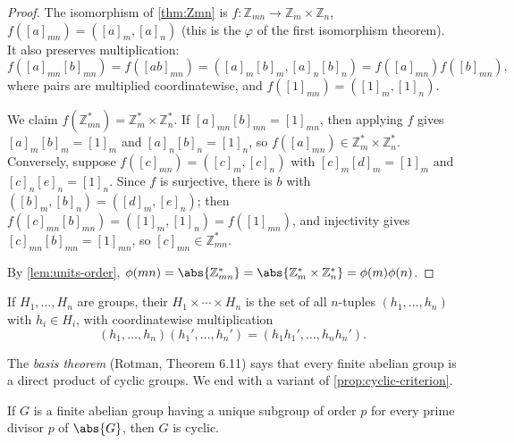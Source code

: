 \begin{proof}
	The isomorphism of \autoref{thm:Zmn} is
	\(f\colon \mathbb Z_{mn} \to \mathbb Z_m \times \mathbb Z_n\),
	\(f([a]_{mn}) = ([a]_m, [a]_n)\) (this is the \(\varphi\) of the first isomorphism
	theorem). It also preserves multiplication:
	\[
		f([a]_{mn}[b]_{mn}) = f([ab]_{mn}) = ([a]_m[b]_m, [a]_n[b]_n) = f([a]_{mn})f([b]_{mn}),
	\]
	where pairs are multiplied coordinatewise, and \(f([1]_{mn}) = ([1]_m, [1]_n)\).

	We claim \(f(\mathbb Z_{mn}^*) = \mathbb Z_m^* \times \mathbb Z_n^*\). If
	\([a]_{mn}[b]_{mn} = [1]_{mn}\), then applying \(f\) gives \([a]_m[b]_m = [1]_m\) and
	\([a]_n[b]_n = [1]_n\), so \(f([a]_{mn}) \in \mathbb Z_m^* \times \mathbb Z_n^*\).
	Conversely, suppose \(f([c]_{mn}) = ([c]_m, [c]_n)\) with \([c]_m[d]_m = [1]_m\) and
	\([c]_n[e]_n = [1]_n\). Since \(f\) is surjective, there is \(b\) with
	\(([b]_m, [b]_n) = ([d]_m, [e]_n)\); then
	\(f([c]_{mn}[b]_{mn}) = ([1]_m, [1]_n) = f([1]_{mn})\), and injectivity gives
	\([c]_{mn}[b]_{mn} = [1]_{mn}\), so \([c]_{mn} \in \mathbb Z_{mn}^*\).

	By \autoref{lem:units-order},
	\(\phi(mn) = \abs{\mathbb Z_{mn}^*} = \abs{\mathbb Z_m^* \times \mathbb Z_n^*}
	= \phi(m)\phi(n)\).
\end{proof}

\begin{definition}
	If \(H_1, \dots, H_n\) are groups, their 
	\(H_1 \times \cdots \times H_n\) is the set of all \(n\)-tuples \((h_1, \dots, h_n)\)
	with \(h_i \in H_i\), with coordinatewise multiplication
	\[
		(h_1, \dots, h_n)(h_1', \dots, h_n') = (h_1h_1', \dots, h_nh_n').
	\]
\end{definition}

The \emph{basis theorem} (Rotman, Theorem 6.11) says that every finite abelian group is a
direct product of cyclic groups. We end with a variant of \autoref{prop:cyclic-criterion}.

\begin{proposition}\label{prop:unique-p-subgroup-cyclic}
	If \(G\) is a finite abelian group having a unique subgroup of order \(p\) for every prime
	divisor \(p\) of \(\abs{G}\), then \(G\) is cyclic.
\end{proposition}

